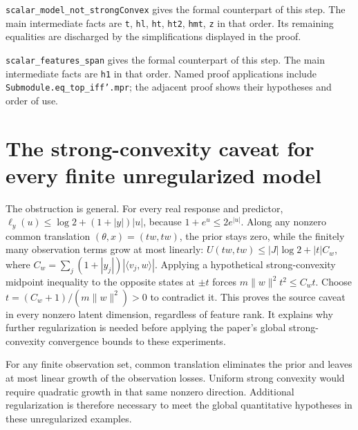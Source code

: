 \documentclass[11pt,a4paper]{article}
\begin{document}
\begin{leanbox}
\texttt{scalar\_\allowbreak{}model\_\allowbreak{}not\_\allowbreak{}strong\allowbreak{}Convex} gives the formal counterpart of this step. The main intermediate facts are \texttt{t}, \texttt{hl}, \texttt{ht}, \texttt{ht2}, \texttt{hmt}, \texttt{z} in that order. Its remaining equalities are discharged by the simplifications displayed in the proof.




\texttt{scalar\_\allowbreak{}features\_\allowbreak{}span} gives the formal counterpart of this step. The main intermediate facts are \texttt{h1} in that order. Named proof applications include \texttt{Submodule.\allowbreak{}eq\_\allowbreak{}top\_\allowbreak{}iff'.\allowbreak{}mpr}; the adjacent proof shows their hypotheses and order of use.
\end{leanbox}

\section{\texorpdfstring{The strong-convexity caveat for every finite unregularized model}{The strong-convexity caveat for every finite unregularized model}}


The obstruction is general. For every real response and predictor, \(\ell_y(u)\le\log2+(1+|y|)|u|\), because \(1+e^u\le2e^{|u|}\). Along any nonzero common translation \((\theta,x)=(tw,tw)\), the prior stays zero, while the finitely many observation terms grow at most linearly: \(U(tw,tw)\le|J|\log2+|t|C_w\), where \(C_w=\sum_j(1+|y_j|)|\langle v_j,w\rangle|\). Applying a hypothetical strong-convexity midpoint inequality to the opposite states at \(\pm t\) forces \(m\|w\|^2t^2\le C_wt\). Choose \(t=(C_w+1)/(m\|w\|^2)>0\) to contradict it. This proves the source caveat in every nonzero latent dimension, regardless of feature rank. It explains why further regularization is needed before applying the paper's global strong-convexity convergence bounds to these experiments.



For any finite observation set, common translation eliminates the prior and leaves at most linear growth of the observation losses. Uniform strong convexity would require quadratic growth in that same nonzero direction. Additional regularization is therefore necessary to meet the global quantitative hypotheses in these unregularized examples.
\end{document}
